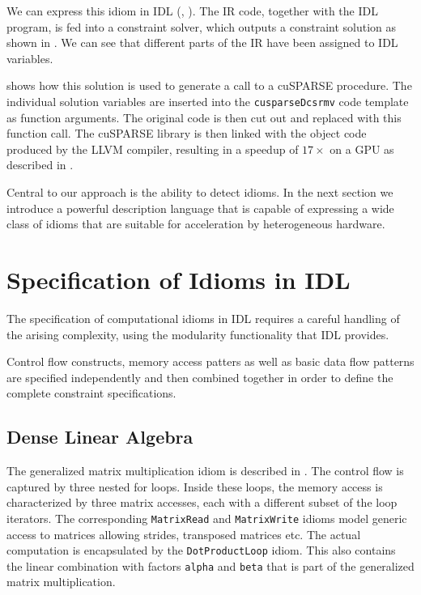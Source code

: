     We can express this idiom in IDL (, ).
    The IR code, together with the IDL program, is fed into a constraint solver,
    which outputs a constraint solution as shown in .
    We can see that different parts of the IR have been assigned to IDL
    variables.

     shows how this solution is used to generate a
    call to a cuSPARSE procedure.
    The individual solution variables are inserted into the {\tt cusparseDcsrmv}
    code template as function arguments. 
    The original code is then cut out and replaced with this function call.
    The cuSPARSE library is then linked with the object code produced by the
    LLVM compiler, resulting in a speedup of $17\times$ on a GPU as described in
    .

    Central to our approach is the ability to detect idioms.
    In the next section we introduce a powerful description language that is
    capable of expressing a wide class of idioms that are suitable for
    acceleration by heterogeneous hardware.

\newpage

\section{Specification of Idioms in IDL}
\label{sec:idioms}

    The specification of computational idioms in IDL requires a careful
    handling of the arising complexity, using the modularity functionality that
    IDL provides.

    Control flow constructs, memory access patters as well as basic data flow
    patterns are specified independently and then combined together in order to
    define the complete constraint specifications.



\subsection{Dense Linear Algebra}

    The generalized matrix multiplication idiom is described in .
    The control flow is captured by three nested for loops.
    Inside these loops, the memory access is characterized by three matrix
    accesses, each with a different subset of the loop iterators.
    The corresponding \texttt{MatrixRead} and \texttt{MatrixWrite} idioms model
    generic access to matrices allowing strides, transposed matrices etc.
    The actual computation is encapsulated by the \texttt{DotProductLoop} idiom.
    This also contains the linear combination with factors \texttt{alpha} and
    \texttt{beta} that is part of the generalized matrix multiplication.

